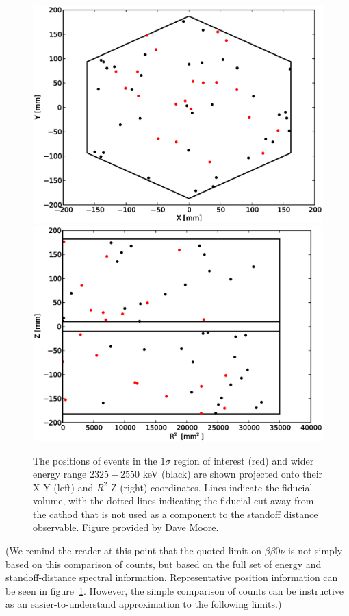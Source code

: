 \begin{figure}
\begin{center}
\includegraphics[keepaspectratio=true,width=.49\textwidth]{ROIdistribution_XY.eps}
\includegraphics[keepaspectratio=true,width=.49\textwidth]{ROIdistribution_RZ.eps}
\end{center}
\renewcommand{\baselinestretch}{1}
\small\normalsize
\begin{quote}
\caption{The positions of events in the $1\sigma$ region of interest (red) and wider energy range $2325-2550$ keV (black) are shown projected onto their X-Y (left) and $R^2$-Z (right) coordinates.  Lines indicate the fiducial volume, with the dotted lines indicating the fiducial cut away from the cathod that is not used as a component to the standoff distance observable. Figure provided by Dave Moore.}
\label{fig:ROIEventPositionDistribution}
\end{quote}
\end{figure}
\renewcommand{\baselinestretch}{2}
\small\normalsize

(We remind the reader at this point that the quoted limit on $\beta\beta 0\nu$ is not simply based on this comparison of counts, but based on the full set of energy and standoff-distance spectral information.  Representative position information can be seen in figure~\ref{fig:ROIEventPositionDistribution}.  However, the simple comparison of counts can be instructive as an easier-to-understand approximation to the following limits.)

